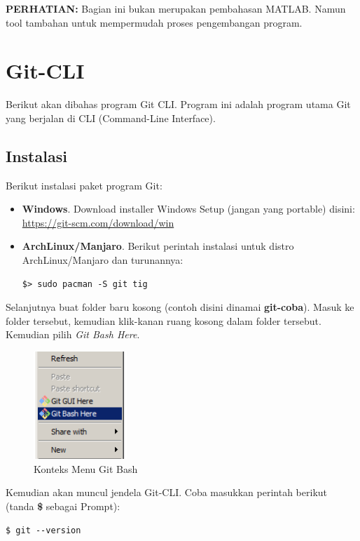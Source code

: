 \documentclass[12pt]{book}
\begin{document}
	\textbf{PERHATIAN:} Bagian ini bukan merupakan pembahasan MATLAB.
	Namun tool tambahan untuk mempermudah proses pengembangan program.
	
	\section{Git-CLI}
	
	Berikut akan dibahas program Git CLI.
	Program ini adalah program utama Git yang berjalan di CLI (Command-Line Interface).
	
	\subsection{Instalasi}
	
	Berikut instalasi paket program Git:
	\begin{itemize}
		\item \textbf{Windows}. Download installer Windows Setup (jangan yang portable) disini:\\
		\url{https://git-scm.com/download/win}
		
		\item \textbf{ArchLinux/Manjaro}. Berikut perintah instalasi untuk distro ArchLinux/Manjaro dan turunannya:
		\begin{verbatim}
$> sudo pacman -S git tig
		\end{verbatim}
	\end{itemize}

	Selanjutnya buat folder baru kosong (contoh disini dinamai \textbf{git-coba}).
	Masuk ke folder tersebut, kemudian klik-kanan ruang kosong dalam folder tersebut.
	Kemudian pilih \textit{Git Bash Here}.
	
	\begin{figure}[!ht]
		\centering
		\includegraphics[width=100pt]{images/githere0}
		\caption{Konteks Menu Git Bash}
	\end{figure}
	
	\newpage
	Kemudian akan muncul jendela Git-CLI.
	Coba masukkan perintah berikut (tanda \textbf{\$} sebagai Prompt):
	\begin{verbatim}
$ git --version
	\end{verbatim}
	
\end{document}
